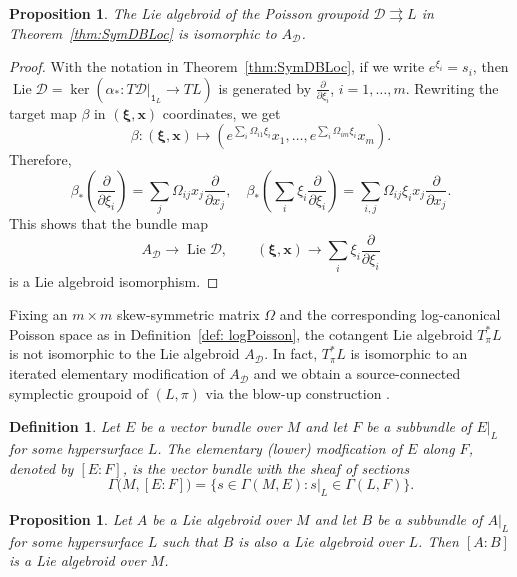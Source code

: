 \documentclass{amsart}
\newtheorem{definition}[theorem]{Definition}
\newtheorem{proposition}[theorem]{Proposition}
\numberwithin{equation}{section}
\newcommand{\bfx}{{\boldsymbol{x}}}
\newcommand{\bfxi}{\boldsymbol{\xi}}
\newcommand{\cD}{\mathcal{D}}
\newcommand{\Lie}{\operatorname{Lie}}
\newcommand{\rra}{\rightrightarrows}
\begin{document}
\begin{proposition}
  The Lie algebroid of the Poisson groupoid $\cD \rra L$ in Theorem~\ref{thm:SymDBLoc} is isomorphic to $A_\cD$.
\end{proposition}
\begin{proof}
  With the notation in Theorem~\ref{thm:SymDBLoc}, if we write $e^{\xi_i} = s_i$, then $\Lie \cD = \ker \left(\alpha_*: T\cD|_{\mathtt{1}_L} \to TL \right)$ is generated by $\frac{\partial}{\partial \xi_i}$, $i = 1, \ldots, m$.
  Rewriting the target map $\beta$ in $(\bfxi, \bfx)$ coordinates, we get
  \[\beta: (\bfxi, \bfx) \mapsto \left(e^{\sum_i\Omega_{i1}\xi_i}x_1, \ldots, e^{\sum_i\Omega_{im}\xi_i}x_m\right).\]
  Therefore, 
  \begin{equation} 
    \label{eq: D anchor}
    \beta_* \left(\frac{\partial}{\partial \xi_i}\right) = \sum_j \Omega_{ij} x_j \frac{\partial}{\partial x_j}, \quad 
    \beta_* \left(\sum_i \xi_i \frac{\partial}{\partial \xi_i}\right) = \sum_{i,j} \Omega_{ij} \xi_i x_j \frac{\partial}{\partial x_j}.
  \end{equation}
  This shows that the bundle map
  \[A_\cD \to \Lie \cD, \qquad (\bfxi, \bfx) \to \sum_i \xi_i \frac{\partial}{\partial \xi_i}\]
  is a Lie algebroid isomorphism.
\end{proof}

Fixing an $m\times m$ skew-symmetric matrix $\Omega$ and the corresponding log-canonical Poisson space as in Definition~\ref{def: logPoisson}, the cotangent Lie algebroid $T^*_\pi L$ is not isomorphic to the Lie algebroid $A_\cD$.
In fact, $T^*_\pi L$ is isomorphic to an iterated elementary modification of $A_\cD$ and we obtain a source-connected symplectic groupoid of $(L,\pi)$ via the blow-up construction \cite{MR3214314}. 
\begin{definition}
  Let $E$ be a vector bundle over $M$ and let $F$ be a subbundle of $E|_L$ for some hypersurface $L$. The \emph{elementary (lower) modfication} of $E$ along $F$, denoted by $[E\!:\!F]$, is the vector bundle with the sheaf of sections
  \[\Gamma\big(M, [E\!:\!F]\big) = \{s \in \Gamma(M, E) : s|_L \in \Gamma(L, F) \}.\]
\end{definition}

\begin{proposition} 
  \cite{MR3214314}
  Let $A$ be a Lie algebroid over $M$ and let $B$ be a subbundle of $A|_L$ for some hypersurface $L$ such that $B$ is also a Lie algebroid over $L$.
  Then $[A\!:\!B]$ is a Lie algebroid over $M$.
\end{proposition}
\end{document}
